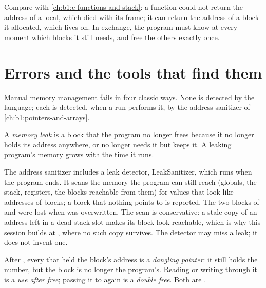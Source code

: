 Compare with \cref{ch:b1:c-functions-and-stack}: a function could not return the address of a local, which died with
its frame; it can return the address of a block it allocated, which lives on. In exchange, the program must know
at every moment which blocks it still needs, and free the others exactly once.

\section{Errors and the tools that find them}\label{sec:b1:dynamic-memory:errors}

Manual memory management fails in four classic ways. None is detected by the language; each is detected, when a
run performs it, by the address sanitizer of \cref{ch:b1:pointers-and-arrays}.

\begin{definition}\label{def:b1:dynamic-memory:leak}
A \emph{memory leak} is a  block that the program no longer frees because it no longer holds its
address anywhere, or no longer needs it but keeps it. A leaking program's memory grows with the time it runs.
\end{definition}

\label{lst:b1:dynamic-memory:leak}

\label{out:b1:dynamic-memory:leak}

The address sanitizer includes a leak detector, LeakSanitizer, which runs when the program ends. It scans the memory
the program can still reach (globals, the stack, registers, the blocks reachable from them) for values that look like
addresses of  blocks; a block that nothing points to is reported. The two blocks of  and
 were lost when  was overwritten. The scan is conservative: a stale copy of an address left in a
dead stack slot makes its block look reachable, which is why this session builds at , where no such copy
survives. The detector may miss a leak; it does not invent one.

\begin{definition}\label{def:b1:dynamic-memory:dangling}
After , every  that held the block's address is a \emph{dangling pointer}:
it still holds the number, but the block is no longer the program's. Reading or writing through it is a \emph{use
after free}; passing it to  again is a \emph{double free}. Both are
.
\end{definition}

